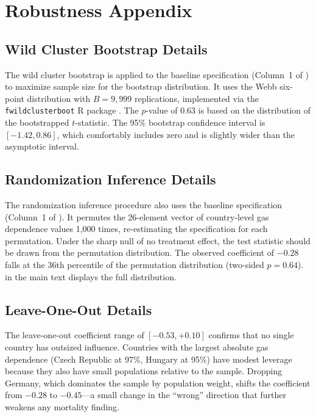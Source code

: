 \documentclass[12pt]{article}
\begin{document}
\section{Robustness Appendix}
\label{sec:app_robust}

\subsection{Wild Cluster Bootstrap Details}

The wild cluster bootstrap is applied to the baseline specification (Column~1 of ) to maximize sample size for the bootstrap distribution. It uses the Webb six-point distribution with $B = 9{,}999$ replications, implemented via the \texttt{fwildclusterboot} R package \citep{fischer2021}. The $p$-value of 0.63 is based on the distribution of the bootstrapped $t$-statistic. The 95\% bootstrap confidence interval is $[-1.42, 0.86]$, which comfortably includes zero and is slightly wider than the asymptotic interval.

\subsection{Randomization Inference Details}

The randomization inference procedure also uses the baseline specification (Column~1 of ). It permutes the 26-element vector of country-level gas dependence values 1,000 times, re-estimating the specification for each permutation. Under the sharp null of no treatment effect, the test statistic should be drawn from the permutation distribution. The observed coefficient of $-0.28$ falls at the 36th percentile of the permutation distribution (two-sided $p = 0.64$).  in the main text displays the full distribution.

\subsection{Leave-One-Out Details}

The leave-one-out coefficient range of $[-0.53, +0.10]$ confirms that no single country has outsized influence. Countries with the largest absolute gas dependence (Czech Republic at 97\%, Hungary at 95\%) have modest leverage because they also have small populations relative to the sample. Dropping Germany, which dominates the sample by population weight, shifts the coefficient from $-0.28$ to $-0.45$---a small change in the ``wrong'' direction that further weakens any mortality finding.
\end{document}
